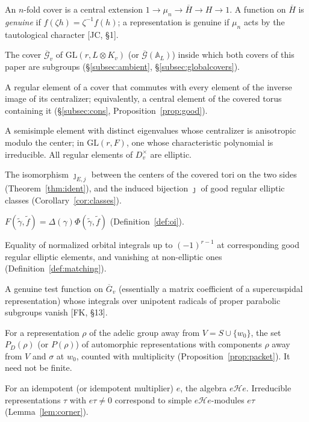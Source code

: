 \documentclass[12pt]{article}
\newcommand{\ov}[1]{\overline{#1}}
\newcommand{\A}{\mathbb{A}}
\newcommand{\GL}{\mathrm{GL}}
\newcommand{\Gb}{\ov{G}}
\newcommand{\cGb}{\ov{\mathcal{G}}}
\newcommand{\jj}{\jmath}
\theoremstyle{plain}
\theoremstyle{definition}
\begin{document}
\begin{description}[style=nextline,leftmargin=1.5em]
\item[Cover, genuine.] An $n$-fold cover is a central extension $1\to\mu_n\to\ov H\to H\to1$. A function on $\ov H$ is \emph{genuine} if $f(\zeta h)=\zeta^{-1}f(h)$; a representation is genuine if $\mu_n$ acts by the tautological character [JC, \S1].
\item[Ambient cover.] The cover $\cGb_v$ of $\GL(r,L\otimes K_v)$ (or $\cGb(\A_L)$) inside which both covers of this paper are subgroups (\S\ref{subsec:ambient}, \S\ref{subsec:globalcovers}).
\item[Good element.] A regular element of a cover that commutes with every element of the inverse image of its centralizer; equivalently, a central element of the covered torus containing it (\S\ref{subsec:cons}, Proposition~\ref{prop:good}).
\item[Elliptic regular element.] A semisimple element with distinct eigenvalues whose centralizer is anisotropic modulo the center; in $\GL(r,F)$, one whose characteristic polynomial is irreducible. All regular elements of $D_v^\times$ are elliptic.
\item[Canonical identification.] The isomorphism $\jj_{E,j}$ between the centers of the covered tori on the two sides (Theorem~\ref{thm:ident}), and the induced bijection $\jj$ of good regular elliptic classes (Corollary~\ref{cor:classes}).
\item[Normalized orbital integral.] $F(\tilde\gamma,\tilde f)=\Delta(\gamma)\Phi(\tilde\gamma,\tilde f)$ (Definition~\ref{def:oi}).
\item[Matching.] Equality of normalized orbital integrals up to $(-1)^{r-1}$ at corresponding good regular elliptic elements, and vanishing at non-elliptic ones (Definition~\ref{def:matching}).
\item[Supercusp form.] A genuine test function on $\Gb_v$ (essentially a matrix coefficient of a supercuspidal representation) whose integrals over unipotent radicals of proper parabolic subgroups vanish [FK, \S13].
\item[Near-equivalence packet.] For a representation $\rho$ of the adelic group away from $V=S\cup\{w_0\}$, the set $P_D(\rho)$ (or $P(\rho)$) of automorphic representations with components $\rho$ away from $V$ and $\sigma$ at $w_0$, counted with multiplicity (Proposition~\ref{prop:packet}). It need not be finite.
\item[Corner Hecke algebra.] For an idempotent (or idempotent multiplier) $e$, the algebra $e\mathcal He$. Irreducible representations $\tau$ with $e\tau\ne0$ correspond to simple $e\mathcal He$-modules $e\tau$ (Lemma~\ref{lem:corner}).

\end{description}
\end{document}
